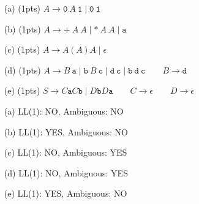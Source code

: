 \documentclass[11pt]{amsart}
\begin{document}
\vspace{.05in}

\begin{enumerate}

\item[(a)] (1pts) $A \rightarrow \texttt{0}\ A\ \texttt{1} \mid \texttt{0}\ \texttt{1}$

\item[(b)] (1pts) $A \rightarrow \texttt{+}\ A\ A \mid \texttt{*}\ A\ A \mid \texttt{a}$

\item[(c)] (1pts) $A \rightarrow A\ \texttt{(}\ A\ \texttt{)}\ A \mid \epsilon$ 

\item[(d)] (1pts) $A \rightarrow B\ \texttt{a} \mid \texttt{b}\ B\ \texttt{c} \mid \texttt{d}\ \texttt{c} \mid \texttt{b}\ \texttt{d}\ \texttt{c} \quad \quad B \rightarrow \texttt{d}$ 

\item[(e)] (1pts) $S \rightarrow C\texttt{a}C\texttt{b} \mid D\texttt{b}D\texttt{a} \quad\quad C \rightarrow \epsilon \quad\quad D \rightarrow \epsilon$

\end{enumerate}

\vspace{0.25cm}

\begin{enumerate}
	\item [(a)] LL(1): NO, Ambiguous: NO
	\item [(b)] LL(1): YES, Ambiguous: NO	
	\item [(c)] LL(1): NO, Ambiguous: YES
	\item [(d)] LL(1): NO, Ambiguous: YES
	\item [(e)] LL(1): YES, Ambiguous: NO
	
\end{enumerate}
\end{document}
